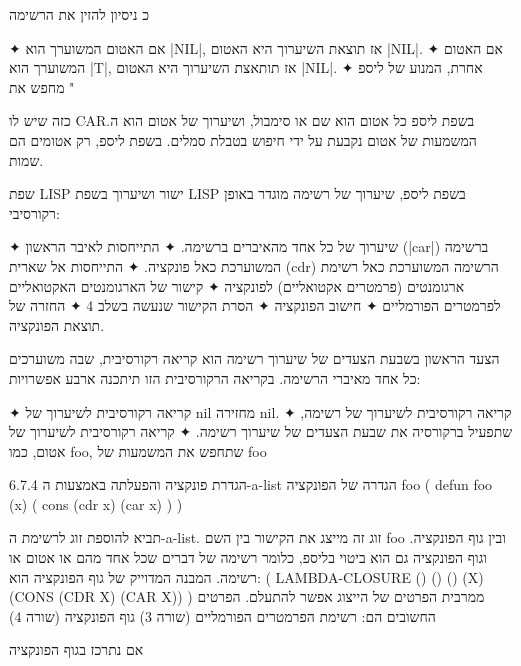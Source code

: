 כ
ניסיון להזין את הרשימה

\begin{enumerate}
  ✦ אם האטום המשוערך הוא \T|NIL|, אז תוצאת השיערוך היא האטום \T|NIL|.
  ✦ אם האטום המשוערך הוא \T|T|, אז תותאצת השיערוך היא האטום \T|NIL|.
  ✦ אחרת, המנוע של ליספ מחפש את "
\end{enumerate}
כזה שיש לו CּARבשפת ליספ כל אטום הוא שם או סימבול,
ושיערוך של אטום
הוא ה.
המשמעות של אטום נקבעת על ידי חיפוש בטבלת סמלים. בשפת ליספ, רק אטומים הם שמות.

שפת LISP
ישור ושיערוך בשפת LISP
בשפת ליספ, שיערוך של רשימה מוגדר באופן רקורסיבי:
\begin{enumerate}
  ✦ שיערוך של כל אחד מהאיברים ברשימה.
  ✦ התייחסות לאיבר הראשון (\E|car|) ברשימה המשוערכת כאל פונקציה.
  ✦ התייחסות אל שארית (cdr) הרשימה המשוערכת כאל רשימת ארגומנטים (פרמטרים
  אקטואליים) לפונקציה
  ✦ קישור של הארגומנטים האקטואליים לפרמטרים הפורמליים
  ✦ חישוב הפונקציה
  ✦ הסרת הקישור שנעשה בשלב 4
  ✦ החזרה של תוצאת הפונקציה.
\end{enumerate}
הצעד הראשון בשבעת הצעדים של שיערוך רשימה הוא קריאה רקורסיבית, שבה משוערכים כל
אחד מאיברי הרשימה. בקריאה הרקורסיבית הזו תיתכנה ארבע אפשרויות:
\begin{enumerate}
  ✦
  קריאה רקורסיבית
  לשיערוך של nil מחזירה nil.
  ✦ קריאה רקורסיבית לשיערוך של רשימה, שתפעיל ברקורסיה את שבעת הצעדים של שיערוך רשימה.
  ✦ קריאה רקורסיבית לשיערוך של אטום, כמו foo, שתחפש את המשמעות של foo
\end{enumerate}

​6.7.4​ הגדרת פונקציה והפעלתה באמצעות ה-a-list
הגדרה של הפונקציה foo
(
defun
foo (x)
(
cons (cdr x) (car x)
)
)

תביא להוספת זוג לרשימת ה-a-list. זוג זה מייצג את הקישור בין השם foo ובין גוף
הפונקציה. וגוף הפונקציה גם הוא ביטוי בליספ, כלומר רשימה של דברים שכל אחד מהם או
אטום או רשימה. המבנה המדוייק של גוף הפונקציה הוא:
(
LAMBDA-CLOSURE () () ()
(X)
(CONS (CDR X) (CAR X))
)
ממרבית הפרטים של הייצוג אפשר להתעלם. הפרטים החשובים הם:
רשימת הפרמטרים הפורמליים (שורה 3)
גוף הפונקציה (שורה 4)

אם נתרכז בגוף הפונקציה

